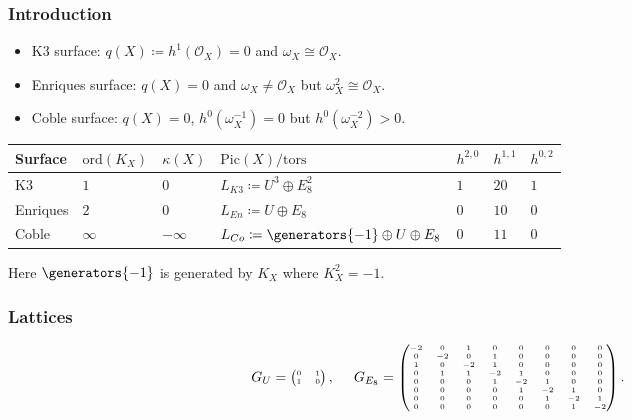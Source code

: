 \documentclass{beamer}
\begin{document}
{\begin{frame}
\frametitle{Introduction}
\begin{itemize}
\item K3 surface: \quad\hspace{0.6em} $q(X) \coloneqq h^1(\mathcal{O}_X) = 0$ and $\omega_X \cong \mathcal{O}_X$.
\item Enriques surface:  $q(X) = 0$ and $\omega_X \neq \mathcal{O}_X$ but $\omega_X^2 \cong \mathcal{O}_X$.
\item Coble surface: \hspace{1em} $q(X) = 0$, $h^0(\omega_X^{-1}) = 0$ but $h^0(\omega_X^{-2}) > 0$.
\end{itemize}
\vspace{1em}
\begin{centering}
{
\small
\begin{tabular}{l|llllll}
	Surface 	& $\mathrm{ord}(K_X)$ & $\kappa(X)$ 	& $\mathrm{Pic}(X)/\mathrm{tors}$ & $h^{2, 0}$ 
		& $h^{1,1}$ & $h^{0, 2}$ \\ \hline
	K3 			& $1$ & $0$ 			& $L_{K3} \coloneqq U^3 \oplus E_8^2$ 
		& $1$ & $20$ & $1$ \\
	Enriques 	& $2$ & $0$ 			& $L_{En} \coloneqq U \oplus E_8$ 
		& $0$ & $10$ & $0$ \\
	Coble 		& $\infty$ & $-\infty$ 		& $L_{Co} \coloneqq \generators{-1} \oplus U \oplus E_8$
		& $0$ & $11$ & $0$ \\
\end{tabular}
}
\end{centering}
\newline
{\small
\newline
Here $\generators{-1}$ is generated by $K_X$ where $K_X^2 = -1$.
}
\end{frame}
\begin{frame}\frametitle{Lattices}
{
\[
\tiny 
G_U = \begin{pmatrix} 0 & 1 \\ 1 & 0 \end{pmatrix}, \qquad
G_{E_8}
=
\begin{pmatrix}
 -2 &  0 & 1 &  0 &  0 &  0 &  0 &  0 \\
 0 &  -2 &  0 & 1 &  0 &  0 &  0 &  0 \\
1 &  0 &  -2 & 1 &  0 &  0 &  0 &  0 \\
 0 & 1 & 1 &  -2 & 1 &  0 &  0 &  0 \\
 0 &  0 &  0 & 1 &  -2 & 1 &  0 &  0 \\
 0 &  0 &  0 &  0 & 1 &  -2 & 1 &  0 \\
 0 &  0 &  0 &  0 &  0 & 1 &  -2 & 1 \\
 0 &  0 &  0 &  0 &  0 &  0 & 1 &  -2
\end{pmatrix}.
\]
}


\end{frame}}
\end{document}
